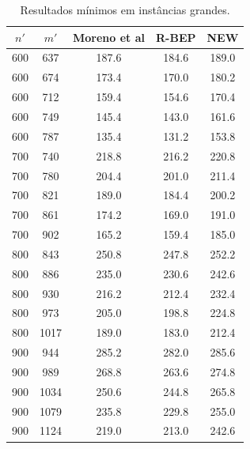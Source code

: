 \begin{table}[ht]
\hspace{0.05\textwidth} %
\begin{minipage}{0.45\textwidth}
    \centering
    \caption{\small Resultados mínimos em instâncias grandes.}
    \begin{tabular}{cc|ccc}
        \hline
        \rowcolor{gray!30} \textbf{\( n' \)} &\textbf{ \( m' \)} & \textbf{Moreno et al} & \textbf{R-BEP} & \textbf{NEW} \\
        \hline
        600  & 637   & 187.6 & \cellcolor{blue!20}184.6  & 189.0  \\
        600  & 674   & 173.4 & \cellcolor{blue!20}170.0  & 180.2  \\
        600  & 712   & 159.4 & \cellcolor{blue!20}154.6  & 170.4  \\
        600  & 749   & 145.4 & \cellcolor{blue!20}143.0  & 161.6  \\
        600  & 787   & 135.4 & \cellcolor{blue!20}131.2  & 153.8  \\
        700  & 740   & 218.8 & \cellcolor{blue!20}216.2  & 220.8  \\
        700  & 780   & 204.4 & \cellcolor{blue!20}201.0  & 211.4  \\
        700  & 821   & 189.0 & \cellcolor{blue!20}184.4  & 200.2  \\
        700  & 861   & 174.2 & \cellcolor{blue!20}169.0  & 191.0  \\
        700  & 902   & 165.2 & \cellcolor{blue!20}159.4  & 185.0  \\
        800  & 843   & 250.8 & \cellcolor{blue!20}247.8  & 252.2  \\
        800  & 886   & 235.0 & \cellcolor{blue!20}230.6  & 242.6  \\
        800  & 930   & 216.2 & \cellcolor{blue!20}212.4  & 232.4  \\
        800  & 973   & 205.0 & \cellcolor{blue!20}198.8  & 224.8  \\
        800  & 1017  & 189.0 & \cellcolor{blue!20}183.0  & 212.4  \\
        900  & 944   & 285.2 & \cellcolor{blue!20}282.0  & 285.6  \\
        900  & 989   & 268.8 & \cellcolor{blue!20}263.6  & 274.8  \\
        900  & 1034  & 250.6 & \cellcolor{blue!20}244.8  & 265.8  \\
        900  & 1079  & 235.8 & \cellcolor{blue!20}229.8  & 255.0  \\
        900  & 1124  & 219.0 & \cellcolor{blue!20}213.0  & 242.6  \\

\end{tabular}
\end{minipage}
\end{table}
